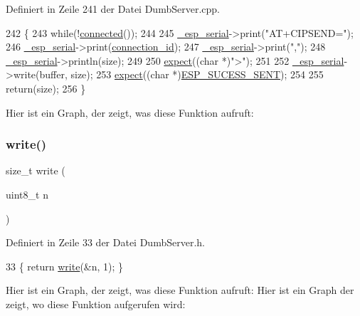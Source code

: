 Definiert in Zeile 241 der Datei Dumb\+Server.\+cpp.


\begin{DoxyCode}
242 \{
243   \textcolor{keywordflow}{while}(!\hyperlink{classEspServer_a59fc494d53391b27e2fd75cb750690d9}{connected}());
244 
245   \hyperlink{classEspServer_a552aab874ad99b696f4c997d6f5a4746}{\_esp\_serial}->print(\textcolor{stringliteral}{"AT+CIPSEND="});
246   \hyperlink{classEspServer_a552aab874ad99b696f4c997d6f5a4746}{\_esp\_serial}->print(\hyperlink{classEspServer_a821bd4e05f0b260cc584a2d23bda0fff}{connection\_id});
247   \hyperlink{classEspServer_a552aab874ad99b696f4c997d6f5a4746}{\_esp\_serial}->print(\textcolor{stringliteral}{","});
248   \hyperlink{classEspServer_a552aab874ad99b696f4c997d6f5a4746}{\_esp\_serial}->println(size);
249 
250   \hyperlink{classEspServer_aff5ea67ab96af075223b2b836036ccf1}{expect}((\textcolor{keywordtype}{char} *)\textcolor{stringliteral}{">"});
251 
252   \hyperlink{classEspServer_a552aab874ad99b696f4c997d6f5a4746}{\_esp\_serial}->write(buffer, size);
253   \hyperlink{classEspServer_aff5ea67ab96af075223b2b836036ccf1}{expect}((\textcolor{keywordtype}{char} *)\hyperlink{DumbServer_8cpp_a3df41d167aea12431009366bf32f28b3}{ESP\_SUCESS\_SENT});
254 
255   \textcolor{keywordflow}{return}(size);
256 \}
\end{DoxyCode}
Hier ist ein Graph, der zeigt, was diese Funktion aufruft\+:
\mbox{\label{classEspServer_af32c245c813bbadb566538bba418b0fe}} 
\subsubsection{\texorpdfstring{write()}{write()}\hspace{0.1cm}{\footnotesize\ttfamily [2/6]}}
{\footnotesize\ttfamily size\+\_\+t write (\begin{DoxyParamCaption}\item[{uint8\+\_\+t}]{n }\end{DoxyParamCaption})\hspace{0.3cm}{\ttfamily [inline]}}



Definiert in Zeile 33 der Datei Dumb\+Server.\+h.


\begin{DoxyCode}
33 \{ \textcolor{keywordflow}{return} \hyperlink{classEspServer_a7c66fc8d559f4956d4ccea196299bca7}{write}(&n, 1); \}
\end{DoxyCode}
Hier ist ein Graph, der zeigt, was diese Funktion aufruft\+:
Hier ist ein Graph der zeigt, wo diese Funktion aufgerufen wird\+:
\mbox{\label{classEspServer_a0ba52a995edf9b6c2cdf3d396be84ff1}} 

